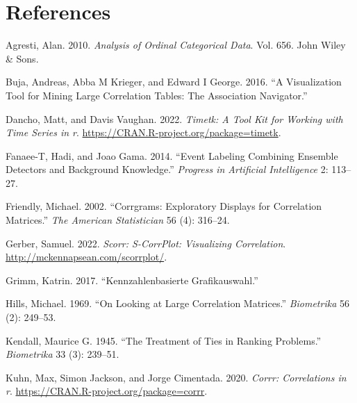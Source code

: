 \hypertarget{references}{%
\section*{References}\label{references}}

\hypertarget{refs}{}
\begin{CSLReferences}{1}{0}
\leavevmode{}%
Agresti, Alan. 2010. \emph{Analysis of Ordinal Categorical Data}. Vol. 656. John Wiley \& Sons.

\leavevmode{}%
Buja, Andreas, Abba M Krieger, and Edward I George. 2016. {``A Visualization Tool for Mining Large Correlation Tables: The Association Navigator.''}

\leavevmode{}%
Dancho, Matt, and Davis Vaughan. 2022. \emph{Timetk: A Tool Kit for Working with Time Series in r}. \url{https://CRAN.R-project.org/package=timetk}.

\leavevmode{}%
Fanaee-T, Hadi, and Joao Gama. 2014. {``Event Labeling Combining Ensemble Detectors and Background Knowledge.''} \emph{Progress in Artificial Intelligence} 2: 113--27.

\leavevmode{}%
Friendly, Michael. 2002. {``Corrgrams: Exploratory Displays for Correlation Matrices.''} \emph{The American Statistician} 56 (4): 316--24.

\leavevmode{}%
Gerber, Samuel. 2022. \emph{Scorr: S-CorrPlot: Visualizing Correlation}. \url{http://mckennapsean.com/scorrplot/}.

\leavevmode{}%
Grimm, Katrin. 2017. {``Kennzahlenbasierte Grafikauswahl.''}

\leavevmode{}%
Hills, Michael. 1969. {``On Looking at Large Correlation Matrices.''} \emph{Biometrika} 56 (2): 249--53.

\leavevmode{}%
Kendall, Maurice G. 1945. {``The Treatment of Ties in Ranking Problems.''} \emph{Biometrika} 33 (3): 239--51.

\leavevmode{}%
Kuhn, Max, Simon Jackson, and Jorge Cimentada. 2020. \emph{Corrr: Correlations in r}. \url{https://CRAN.R-project.org/package=corrr}.


\end{CSLReferences}
